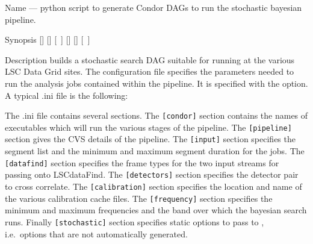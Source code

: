 \begin{entry}
\item[Name]
 --- python script to generate Condor DAGs
to run the stochastic bayesian pipeline.

\item[Synopsis]
 \newline \hspace*{0.5in}
[] \newline \hspace*{0.5in}
[] \newline \hspace*{0.5in}
[~] \newline \hspace*{0.5in}
[] \newline \hspace*{0.5in}
[] \newline \hspace*{0.5in}
[~] \newline \hspace*{0.5in}
~ \newline \hspace*{0.5in}
~

\item[Description]  builds a stochastic
search DAG suitable for running at the various LSC Data Grid sites. The
configuration file specifies the parameters needed to run the analysis
jobs contained within the pipeline. It is specified with the
 option. A typical .ini file is the following:



The .ini file contains several sections. The \verb$[condor]$ section
contains the names of executables which will run the various stages of
the pipeline. The \verb$[pipeline]$ section gives the CVS details of the
pipeline. The \verb$[input]$ section specifies the segment list and the
minimum and maximum segment duration for the jobs. The \verb$[datafind]$
section specifies the frame types for the two input streams for passing
onto LSCdataFind. The \verb$[detectors]$ section specifies the detector
pair to cross correlate. The \verb$[calibration]$ section specifies the
location and name of the various calibration cache files. The
\verb$[frequency]$ section specifies the minimum and maximum frequencies
and the band over which the bayesian search runs. Finally
\verb$[stochastic]$ section specifies static options to pass to
, i.e.~options that are not automatically
generated.


\end{entry}

